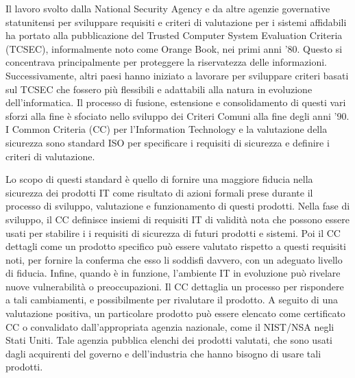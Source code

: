 Il lavoro svolto dalla National Security Agency e da altre agenzie governative statunitensi per sviluppare requisiti e criteri di valutazione per i sistemi affidabili ha portato alla pubblicazione del Trusted Computer System Evaluation Criteria (TCSEC), informalmente noto come Orange Book, nei primi anni '80. Questo si concentrava principalmente per proteggere la riservatezza delle informazioni. Successivamente, altri paesi hanno iniziato a lavorare per sviluppare criteri basati sul TCSEC che fossero più flessibili e adattabili alla natura in evoluzione dell'informatica. Il processo di fusione, estensione e consolidamento di questi vari sforzi alla fine è sfociato nello sviluppo dei Criteri Comuni alla fine degli anni '90. I Common Criteria (CC) per l'Information Technology e la valutazione della sicurezza sono standard ISO per specificare i requisiti di sicurezza e definire i criteri di valutazione.

\singlespacing

Lo scopo di questi standard è quello di fornire una maggiore fiducia nella sicurezza dei prodotti IT come risultato di azioni formali prese durante il processo di sviluppo, valutazione e funzionamento di questi prodotti. Nella fase di sviluppo, il CC definisce insiemi di requisiti IT di validità nota che possono essere usati per stabilire i i requisiti di sicurezza di futuri prodotti e sistemi. Poi il CC dettagli come un prodotto specifico può essere valutato rispetto a questi requisiti noti, per fornire la conferma che esso li soddisfi davvero, con un adeguato livello di fiducia. Infine, quando è in funzione, l'ambiente IT in evoluzione può rivelare nuove vulnerabilità o preoccupazioni. Il CC dettaglia un processo per rispondere a tali cambiamenti, e possibilmente per rivalutare il prodotto. A seguito di una valutazione positiva, un particolare prodotto può essere elencato come certificato CC o convalidato dall'appropriata agenzia nazionale, come il NIST/NSA negli Stati Uniti. Tale agenzia pubblica elenchi dei prodotti valutati, che sono usati dagli acquirenti del governo e dell'industria che hanno bisogno di usare tali prodotti.
\newpage
